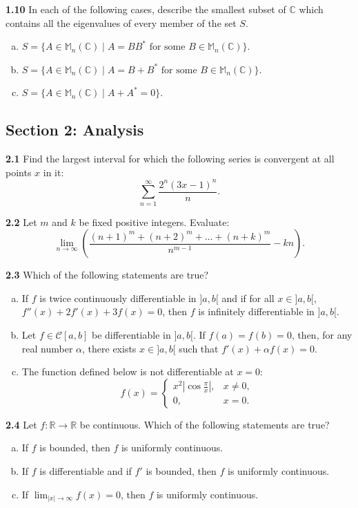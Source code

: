 \documentclass[11pt,a4paper]{article}
\newcommand{\R}{\mathbb{R}}
\newcommand{\C}{\mathbb{C}}
\newcommand{\M}{\mathbb{M}}
\newcommand{\examsec}[1]{%
  \subsection*{#1}
  \vspace{-2pt}
}
\newcommand{\qitem}[1]{\par\medskip\noindent\textbf{#1}\hspace{0.5em}}
\begin{document}
\qitem{1.10} In each of the following cases, describe the smallest subset of $\C$ which contains all the eigenvalues of every member of the set $S$.
\begin{enumerate}[a.]
  \item $S = \{A \in \M_n(\C) \mid A = BB^* \text{ for some } B \in \M_n(\C)\}$.
  \item $S = \{A \in \M_n(\C) \mid A = B + B^* \text{ for some } B \in \M_n(\C)\}$.
  \item $S = \{A \in \M_n(\C) \mid A + A^* = 0\}$.
\end{enumerate}

\examsec{Section 2: Analysis}

\qitem{2.1} Find the largest interval for which the following series is convergent at all points $x$ in it:
\[
  \sum_{n=1}^{\infty} \frac{2^n(3x - 1)^n}{n}.
\]

\qitem{2.2} Let $m$ and $k$ be fixed positive integers. Evaluate:
\[
  \lim_{n \to \infty} \left(\frac{(n+1)^m + (n+2)^m + \dots + (n+k)^m}{n^{m-1}} - kn\right).
\]

\qitem{2.3} Which of the following statements are true?
\begin{enumerate}[a.]
  \item If $f$ is twice continuously differentiable in $]a, b[$ and if for all $x \in ]a, b[$, $f''(x) + 2f'(x) + 3f(x) = 0$, then $f$ is infinitely differentiable in $]a, b[$.
  \item Let $f \in \mathcal{C}[a, b]$ be differentiable in $]a, b[$. If $f(a) = f(b) = 0$, then, for any real number $\alpha$, there exists $x \in ]a, b[$ such that $f'(x) + \alpha f(x) = 0$.
  \item The function defined below is not differentiable at $x = 0$:
  \[
    f(x) = \begin{cases} x^2 \left|\cos\frac{\pi}{x}\right|, & x \neq 0, \\ 0, & x = 0. \end{cases}
  \]
\end{enumerate}

\qitem{2.4} Let $f : \R \to \R$ be continuous. Which of the following statements are true?
\begin{enumerate}[a.]
  \item If $f$ is bounded, then $f$ is uniformly continuous.
  \item If $f$ is differentiable and if $f'$ is bounded, then $f$ is uniformly continuous.
  \item If $\lim_{|x| \to \infty} f(x) = 0$, then $f$ is uniformly continuous.
\end{enumerate}
\end{document}

